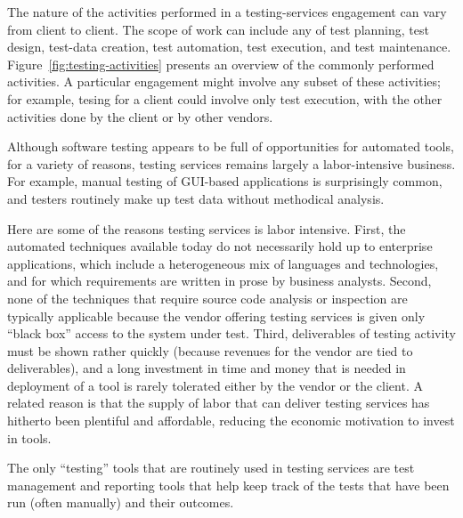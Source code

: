 The nature of the activities performed in a testing-services engagement can vary
from client to client. The scope of work can include any of test planning, test
design, test-data creation, test automation, test execution, and test
maintenance.  Figure~\ref{fig:testing-activities} presents an overview of the
commonly performed activities.  A particular engagement might involve any subset
of these activities; for example, tesing for a client could involve only test
execution, with the other activities done by the client or by other vendors.


Although software testing appears to be full of opportunities for automated tools,
for a variety of reasons, testing services remains largely a labor-intensive
business.  For example, manual testing of GUI-based applications is surprisingly
common, and testers routinely make up test data without methodical analysis.

Here are some of the reasons testing services is labor intensive.  First, the
automated techniques available today do not necessarily hold up to enterprise
applications, which include a heterogeneous mix of languages and technologies,
and for which requirements are written in prose by business analysts.  Second,
none of the techniques that require source code analysis or inspection are
typically applicable because the vendor offering testing services is given only
``black box'' access to the system under test.  Third, deliverables of testing
activity must be shown rather quickly (because revenues for the vendor are tied
to deliverables), and a long investment in time and money that is needed in
deployment of a tool is rarely tolerated either by the vendor or the client.  A
related reason is that the supply of labor that can deliver testing services has
hitherto been plentiful and affordable, reducing the economic motivation to
invest in tools.

The only ``testing'' tools that are routinely used in testing services are test
management and reporting tools that help keep track of the tests that have been
run (often manually) and their outcomes.

